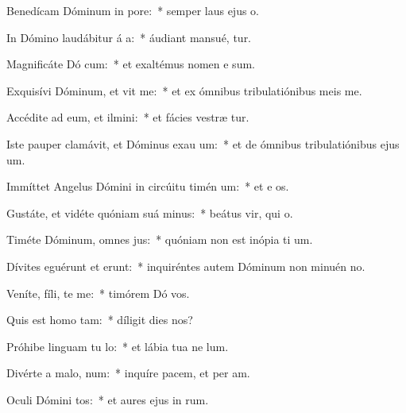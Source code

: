 \item Benedícam Dóminum in  pore:~* semper laus ejus   o.
\item In Dómino laudábitur á a:~* áudiant mansué,  tur.
\item Magnificáte Dó cum:~* et exaltémus nomen e  sum.
\item Exquisívi Dóminum, et vit me:~* et ex ómnibus tribulatiónibus meis  me.
\item Accédite ad eum, et ilmini:~* et fácies vestræ  tur.
\item Iste pauper clamávit, et Dóminus exau um:~* et de ómnibus tribulatiónibus ejus  um.
\item Immíttet Angelus Dómini in circúitu timén um:~* et e os.
\item Gustáte, et vidéte quóniam suá  minus:~* beátus vir, qui   o.
\item Timéte Dóminum, omnes  jus:~* quóniam non est inópia ti um.
\item Dívites eguérunt et erunt:~* inquiréntes autem Dóminum non minuén  no.
\item Veníte, fíli, te me:~* timórem Dó  vos.
\item Quis est homo   tam:~* díligit dies  nos?
\item Próhibe linguam tu  lo:~* et lábia tua ne  lum.
\item Divérte a malo,   num:~* inquíre pacem, et per am.
\item Oculi Dómini  tos:~* et aures ejus in  rum.
